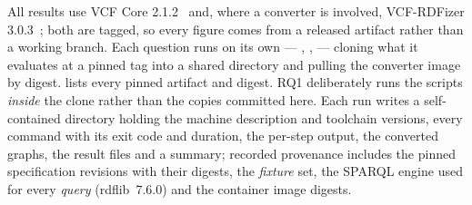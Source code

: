 All results use VCF Core 2.1.2~\cite{vcfc210} and, where a converter is involved, VCF-RDFizer 3.0.3~\cite{vcfrConverter2026}; both are tagged, so every figure comes from a released artifact rather than a working branch.
Each question runs on its own --- , ,  --- cloning what it evaluates at a pinned tag into a shared  directory and pulling the converter image by digest. 
 lists every pinned artifact and digest.
RQ1 deliberately runs the scripts \emph{inside} the clone rather than the copies committed here.
Each run writes a self-contained directory holding the machine description and toolchain versions, every command with its exit code and duration, the per-step output, the converted graphs, the result files and a summary; recorded provenance includes the pinned specification revisions with their digests, the \emph{fixture} set, the SPARQL engine used for every \emph{query} (rdflib~7.6.0) and the container image digests.
